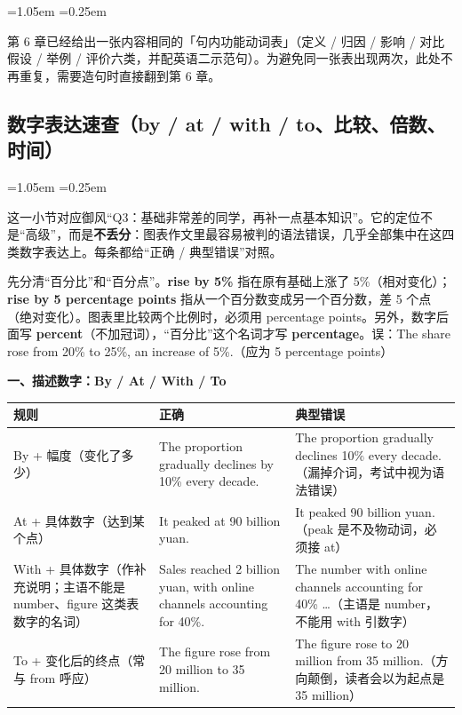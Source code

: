 \documentclass[11pt,a4paper]{ctexart}
\newcommand{\kw}[1]{{\bfseries\color{accent}#1}}
\newcommand{\zone}[1]{\par\addvspace{3pt}\noindent{\bfseries\color{accent}【雷区】}#1\par\addvspace{3pt}}
\newenvironment{note}{%
  \par\addvspace{5pt}%
  \begin{list}{}{\leftmargin=1.05em \rightmargin=0.25em \listparindent=0pt
    \itemindent=0pt \topsep=0pt \parsep=2pt \itemsep=2pt \partopsep=0pt}%
  \item\relax\small\color{ink}%
}{%
  \end{list}\addvspace{5pt}%
}
\begin{document}
\begin{note}
第 6 章已经给出一张内容相同的「句内功能动词表」（定义 / 归因 / 影响 / 对比假设 / 举例 / 评价六类，并配英语二示范句）。为避免同一张表出现两次，此处不再重复，需要造句时直接翻到第 6 章。
\end{note}



\subsection{数字表达速查（by / at / with / to、比较、倍数、时间）}

\begin{note}
这一小节对应御风“Q3：基础非常差的同学，再补一点基本知识”。它的定位不是“高级”，而是\textbf{不丢分}：图表作文里最容易被判的语法错误，几乎全部集中在这四类数字表达上。每条都给“正确 / 典型错误”对照。
\end{note}

\zone{先分清“百分比”和“百分点”。\kw{rise by 5\%} 指在原有基础上涨了 5\%（相对变化）；\kw{rise by 5 percentage points} 指从一个百分数变成另一个百分数，差 5 个点（绝对变化）。图表里比较两个比例时，必须用 percentage points。另外，数字后面写 \kw{percent}（不加冠词），“百分比”这个名词才写 \kw{percentage}。误：The share rose from 20\% to 25\%, an increase of 5\%.（应为 5 percentage points）}

\par\addvspace{5pt}\noindent\textbf{一、描述数字：By / At / With / To}\par\addvspace{2pt}
\begin{longtable}{L{4.0cm}L{6.2cm}L{5.5cm}}
\toprule
\textbf{规则} & \textbf{正确} & \textbf{典型错误} \\
\midrule
\endhead
By + 幅度（变化了多少） & The proportion gradually declines by 10\% every decade. & The proportion gradually declines 10\% every decade.（漏掉介词，考试中视为语法错误） \\
At + 具体数字（达到某个点） & It peaked at 90 billion yuan. & It peaked 90 billion yuan.（peak 是不及物动词，必须接 at） \\
With + 具体数字（作补充说明；主语不能是 number、figure 这类表数字的名词） & Sales reached 2 billion yuan, with online channels accounting for 40\%. & The number with online channels accounting for 40\% \ldots（主语是 number，不能用 with 引数字） \\
To + 变化后的终点（常与 from 呼应） & The figure rose from 20 million to 35 million. & The figure rose to 20 million from 35 million.（方向颠倒，读者会以为起点是 35 million） \\
\bottomrule
\end{longtable}
\end{document}

